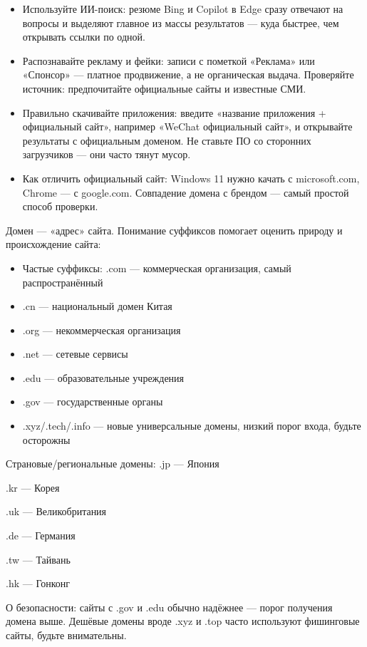 
\begin{itemize}
  \item Используйте ИИ-поиск: резюме Bing и Copilot в Edge сразу отвечают на вопросы и выделяют главное из массы результатов — куда быстрее, чем открывать ссылки по одной.
  \item Распознавайте рекламу и фейки: записи с пометкой «Реклама» или «Спонсор» — платное продвижение, а не органическая выдача. Проверяйте источник: предпочитайте официальные сайты и известные СМИ.
  \item Правильно скачивайте приложения: введите «название приложения + официальный сайт», например «WeChat официальный сайт», и открывайте результаты с официальным доменом. Не ставьте ПО со сторонних загрузчиков — они часто тянут мусор.
  \item Как отличить официальный сайт: Windows 11 нужно качать с microsoft.com, Chrome — с google.com. Совпадение домена с брендом — самый простой способ проверки.
\end{itemize}


Домен — «адрес» сайта. Понимание суффиксов помогает оценить природу и происхождение сайта:

\begin{itemize}
  \item Частые суффиксы: .com — коммерческая организация, самый распространённый
  \item .cn — национальный домен Китая
  \item .org — некоммерческая организация
  \item .net — сетевые сервисы
  \item .edu — образовательные учреждения
  \item .gov — государственные органы
  \item .xyz/.tech/.info — новые универсальные домены, низкий порог входа, будьте осторожны
\end{itemize}

Страновые/региональные домены: .jp — Япония

.kr — Корея

.uk — Великобритания

.de — Германия

.tw — Тайвань

.hk — Гонконг

О безопасности: сайты с .gov и .edu обычно надёжнее — порог получения домена выше. Дешёвые домены вроде .xyz и .top часто используют фишинговые сайты, будьте внимательны.

